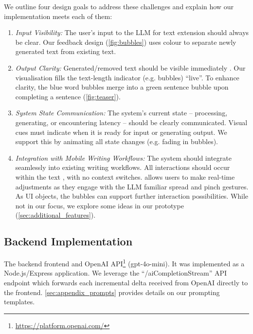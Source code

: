 We outline four design goals to address these challenges and explain how our implementation meets each of them:
\begin{enumerate} 
\item \textit{Input Visibility:}
The user's input to the LLM for text extension should always be clear. %
Our feedback design (\cref{fig:bubbles}) uses colour to  separate newly generated text from existing text.
\item \textit{Output Clarity:}
Generated/removed text should be visible immediately . %
Our visualisation fills the text-length indicator (e.g. bubbles) ``live''. To  enhance clarity, the blue word bubbles merge into a green sentence bubble upon completing a sentence (\cref{fig:teaser}). %

\item \textit{System State Communication:}  
The system’s current state -- processing, generating, or encountering latency -- should be clearly communicated. 
Visual cues must indicate when it is ready for input or generating output. We support this by animating all state changes (e.g. fading in bubbles). %

\item \textit{Integration with Mobile Writing Workflows:}
The system should integrate seamlessly into existing  writing workflows.
All interactions should occur within the text , with no context switches.
 allows users to make real-time adjustments as they engage with the LLM  familiar spread and pinch gestures.
As UI objects, the bubbles can support further interaction possibilities. While not in our focus, we explore some ideas in our prototype (\cref{sec:additional_features}).
\end{enumerate}


\subsection{Backend Implementation}\label{sec:backend}
The backend  frontend and OpenAI API\footnote{\url{https://platform.openai.com/}} (gpt-4o-mini).
It %
was implemented as a Node.js/Express application. 
We leverage the ``/aiCompletionStream'' API endpoint which forwards each incremental delta received from OpenAI directly to the frontend.
\cref{sec:appendix_prompts} provides details on our prompting templates.

